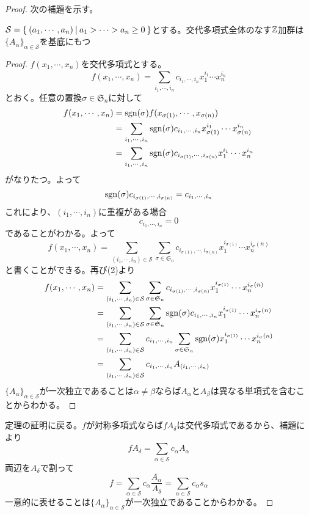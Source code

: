 \documentclass{ltjsreport}
\begin{document}
\begin{proof}
    次の補題を示す。
    \begin{lemm}
        $\mathcal{S}=\left\{\:(a_1,\cdots,a_n)\:\middle|\:a_1>\cdots>a_n\geq 0\:\right\}$とする。交代多項式全体のなす$\mathbb{Z}$加群は$\{A_\alpha\}_{\alpha\in\mathcal{S}}$を基底にもつ
    \end{lemm}
    \begin{proof}
        $f(x_1,\cdots,x_n)$を交代多項式とする。
        \[
        f(x_1,\cdots,x_n)=\sum_{i_1,\cdots,i_n}c_{i_1,\cdots,i_n}x_1^{i_1}\cdots x_n^{i_n}    
        \]
        とおく。任意の置換$\sigma\in\mathfrak{S}_n$に対して
        \begin{align*}
            f(x_1,\cdots,x_n)&=\mathrm{sgn}(\sigma)f(x_{\sigma(1)},\cdots,x_{\sigma(n)})\\
            &=\sum_{i_1,\cdots,i_n}\mathrm{sgn}(\sigma)c_{i_1,\cdots,i_n}x_{\sigma(1)}^{i_1}\cdots x_{\sigma(n)}^{i_n}\\
            &=\sum_{i_1,\cdots,i_n}\mathrm{sgn}(\sigma)c_{i_{\sigma(1)},\cdots,i_{\sigma(n)}}x_1^{i_1}\cdots x_n^{i_n}
        \end{align*}
        がなりたつ。よって
        \begin{equation}
            \mathrm{sgn}(\sigma)c_{i_{\sigma(1)},\cdots,i_{\sigma(n)}}=c_{i_1,\cdots,i_n}
        \end{equation}
        これにより、$(i_1,\cdots,i_n)$に重複がある場合
        \[
        c_{i_1,\cdots,i_n}=0
        \]
        であることがわかる。よって
        \[
        f(x_1,\cdots,x_n)=\sum_{(i_1,\cdots,i_n)\in\mathcal{S}}\sum_{\sigma\in\mathfrak{S}_n}c_{i_{\sigma(1)},\cdots,i_{\sigma(n)}}x_1^{i_{\sigma(1)}}\cdots x_n^{i_\sigma(n)}    
        \]
        と書くことができる。再び(2)より
        \begin{align*}
        f(x_1,\cdots,x_n)
        &=\sum_{(i_1,\cdots,i_n)\in\mathcal{S}}\sum_{\sigma\in\mathfrak{S}_n}c_{i_{\sigma(1)},\cdots,i_{\sigma(n)}}x_1^{i_{\sigma(1)}}\cdots x_n^{i_\sigma(n)}\\
        &=\sum_{(i_1,\cdots,i_n)\in\mathcal{S}}\sum_{\sigma\in\mathfrak{S}_n}\mathrm{sgn}(\sigma)c_{i_1,\cdots,i_n}x_1^{i_{\sigma(1)}}\cdots x_n^{i_\sigma(n)}\\
        &=\sum_{(i_1,\cdots,i_n)\in\mathcal{S}}c_{i_1,\cdots,i_n}\sum_{\sigma\in\mathfrak{S}_n}\mathrm{sgn}(\sigma)x_1^{i_{\sigma(1)}}\cdots x_n^{i_\sigma(n)}\\
        &=\sum_{(i_1,\cdots,i_n)\in\mathcal{S}}c_{i_1,\cdots,i_n}A_{(i_1,\cdots,i_n)}
        \end{align*}
        $\{A_\alpha\}_{\alpha\in\mathcal{S}}$が一次独立であることは$\alpha\neq\beta$ならば$A_\alpha$と$A_\beta$は異なる単項式を含むことからわかる。
    \end{proof}

    定理の証明に戻る。$f$が対称多項式ならば$fA_\delta$は交代多項式であるから、補題により
    \[
    fA_\delta=\sum_{\alpha\in\mathcal{S}}c_\alpha A_\alpha    
    \]
    両辺を$A_\delta$で割って
    \[
    f=\sum_{\alpha\in\mathcal{S}}c_{\alpha}\frac{A_\alpha}{A_\delta}=\sum_{\alpha\in\mathcal{S}}c_{\alpha}s_\alpha    
    \]
    一意的に表せることは$\{A_\alpha\}_{\alpha\in\mathcal{S}}$が一次独立であることからわかる。
\end{proof}
\end{document}

